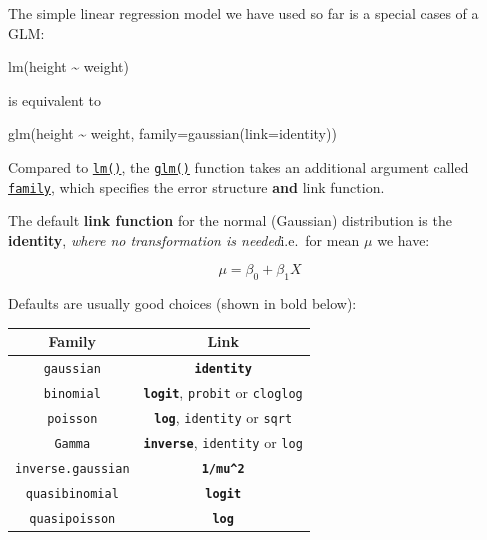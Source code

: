 \documentclass[
]{book}
\newenvironment{Shaded}{\begin{snugshade}}{\end{snugshade}}
\newcommand{\AttributeTok}[1]{\textcolor[rgb]{0.77,0.63,0.00}{#1}}
\newcommand{\FunctionTok}[1]{\textcolor[rgb]{0.00,0.00,0.00}{#1}}
\newcommand{\NormalTok}[1]{#1}
\newcommand{\SpecialCharTok}[1]{\textcolor[rgb]{0.00,0.00,0.00}{#1}}
\begin{document}
The simple linear regression model we have used so far is a special cases of a GLM:

\begin{Shaded}
\begin{Highlighting}[]
\FunctionTok{lm}\NormalTok{(height }\SpecialCharTok{\textasciitilde{}}\NormalTok{ weight)}
\end{Highlighting}
\end{Shaded}

is equivalent to

\begin{Shaded}
\begin{Highlighting}[]
\FunctionTok{glm}\NormalTok{(height }\SpecialCharTok{\textasciitilde{}}\NormalTok{ weight, }\AttributeTok{family=}\FunctionTok{gaussian}\NormalTok{(}\AttributeTok{link=}\NormalTok{identity))}
\end{Highlighting}
\end{Shaded}

Compared to \href{https://www.rdocumentation.org/packages/stats/versions/3.5.1/topics/lm}{\texttt{lm()}}, the \href{https://www.rdocumentation.org/packages/stats/versions/3.5.1/topics/glm}{\texttt{glm()}} function takes an additional argument called \href{https://www.rdocumentation.org/packages/stats/versions/3.5.1/topics/family}{\texttt{family}}, which
specifies the error structure \textbf{and} link function.

The default \textbf{link function} for the normal (Gaussian) distribution is the \textbf{identity}, \emph{where no transformation is needed}i.e.~for mean \(\mu\) we have:

\[
\mu = \beta_0 + \beta_1 X
\]

Defaults are usually good choices (shown in bold below):

\begin{longtable}[]{@{}cc@{}}
\toprule
Family & Link \\
\midrule
\endhead
\texttt{gaussian} & \textbf{\texttt{identity}} \\
\texttt{binomial} & \textbf{\texttt{logit}}, \texttt{probit} or \texttt{cloglog} \\
\texttt{poisson} & \textbf{\texttt{log}}, \texttt{identity} or \texttt{sqrt} \\
\texttt{Gamma} & \textbf{\texttt{inverse}}, \texttt{identity} or \texttt{log} \\
\texttt{inverse.gaussian} & \textbf{\texttt{1/mu\^{}2}} \\
\texttt{quasibinomial} & \textbf{\texttt{logit}} \\
\texttt{quasipoisson} & \textbf{\texttt{log}} \\
\bottomrule
\end{longtable}
\end{document}
